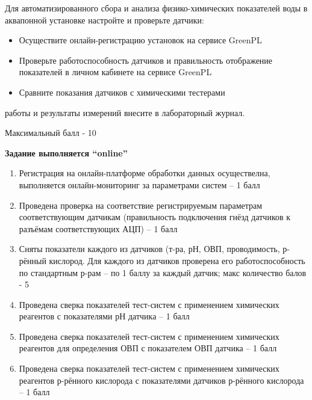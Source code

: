 
Для автоматизированного сбора и анализа физико-химических показателей воды в аквапонной установке настройте и проверьте датчики:
\begin{itemize}
    \item Осуществите онлайн-регистрацию установок на сервисе GreenPL
    \item Проверьте работоспособность датчиков и правильность отображение показателей в личном кабинете на сервисе GreenPL
    \item  Сравните показания датчиков с химическими тестерами
\end{itemize}
   
 работы и результаты измерений внесите в лабораторный журнал. 

Максимальный балл - 10

\textbf{Задание выполняется “online”}

\markSection

\begin{enumerate}
    \item	Регистрация на онлайн-платформе обработки данных осуществелна, выполняется онлайн-мониторинг за параметрами систем – 1 балл
    \item	Проведена проверка на соответствие регистрируемым параметрам соответствующим датчикам (правильность подключения гнёзд датчиков к разъёмам соответствующих АЦП) – 1 балл
    \item	Сняты показатели каждого из датчиков (т-ра, рН, ОВП, проводимость, р-рённый кислород. Для каждого из датчиков проверена его работоспособность по стандартным р-рам – по 1 баллу за каждый датчик; макс количество балов - 5
    \item	Проведена сверка показателей тест-систем с применением химических реагентов с показателями рН датчика – 1 балл
    \item	Проведена сверка показателей тест-систем с применением химических реагентов для определения ОВП с показателем ОВП датчика – 1 балл
    \item	Проведена сверка показателей тест-систем с применением химических реагентов р-рённого кислорода с показателями датчиков р-рённого кислорода – 1 балл

\end{enumerate}
